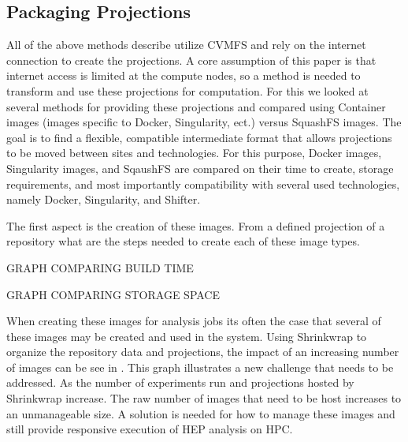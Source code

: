 \documentclass[conference]{IEEEtran}
\begin{document}
\subsection{Packaging Projections}

All of the above methods describe utilize CVMFS
and rely on the internet connection to create
the projections.
A core assumption of this paper is that internet
access is limited at the compute nodes, so a method
is needed to transform and use these projections
for computation.
For this we looked at several methods for providing
these projections and compared using 
Container images (images specific to Docker, Singularity, ect.)
versus SquashFS images.
The goal is to find a flexible, compatible intermediate
format that allows projections to be moved between sites
and technologies.
For this purpose, Docker images, Singularity images, and 
SqaushFS are compared on their time to create,
storage requirements, and most importantly compatibility
with several used technologies, namely 
Docker, Singularity, and Shifter.

The first aspect is the creation of these images.
From a defined projection of a repository
what are the steps needed to create each of these image types.

GRAPH COMPARING BUILD TIME

GRAPH COMPARING STORAGE SPACE


When creating these images for analysis jobs its often the case that several
of these images may be created and used in the system.
Using Shrinkwrap to organize the repository data and projections,
the impact of an increasing number of images can be see in 
.
This graph illustrates a new challenge that needs to be addressed.
As the number of experiments run and projections hosted by Shrinkwrap
increase. 
The raw number of images that need to be host increases to an unmanageable
size.
A solution is needed for how to manage these images and still
provide responsive execution of HEP analysis on HPC.
\end{document}

